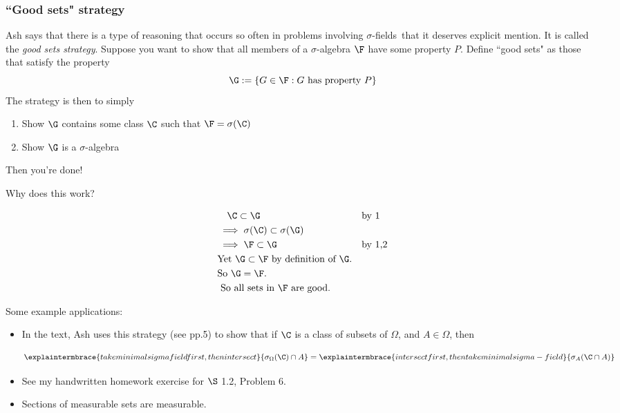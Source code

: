 \documentclass{article} %
\newcommand{\sfs}{$\sigma$-fields}
\begin{document}
\subsubsection{``Good sets" strategy} \label{sec:good_sets_strategy}

Ash says that there is a type of reasoning that occurs so often in problems involving \sfs\ that it deserves explicit mention.  It is called the \textit{good sets strategy}.   Suppose you want to show that all members of a $\sigma$-algebra   $\F$ have some property $P$.  Define ``good sets" as those that satisfy the property
\[ \G := \{ G \in \F : G \text{ has property } P \} \]
The strategy is then to simply
\begin{enumerate}
\item Show $\G$ contains some class $\C$ such that $\F = \sigma(\C)$
\item Show $\G$ is a $\sigma$-algebra 	
\end{enumerate}


Then you're done!  

Why does this work?

\begin{align*}
& \quad \C \subset \G &&	\text{by 1}\\
&\implies \sigma(\C) \subset \sigma(\G) &&  \\
&\implies \F \subset \G && \text{by 1,2} \\
& \text{Yet $\G \subset \F$ by definition of $\G$.} && \\
& \text{So $\G = \F$.} && \\
& \text{ So all sets in $\F$ are good.} && \\
\end{align*}

Some example applications:
 \begin{itemize}
 \item In the text, Ash uses this strategy (see pp.5) to show that if $\C$ is a class of subsets of $\Omega$, and $A \in \Omega$, then

\[ \explaintermbrace{take minimal sigma field first, then intersect}{\sigma_\Omega(\C) \cap A} = \explaintermbrace{intersect first, then take minimal sigma-field}{\sigma_A(\C \cap A)} \]
 \item  See my handwritten homework exercise for  $\S$ 1.2, Problem 6.
 \item Sections of measurable sets are measurable.
 \end{itemize}
\end{document}
